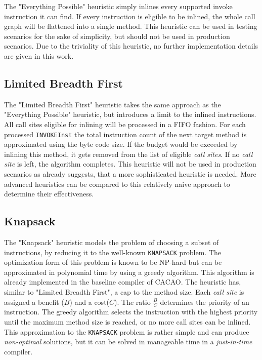 \documentclass[draft, final]{vutinfth} %
\begin{document}
The "Everything Possible" heuristic simply inlines every supported invoke instruction it can find. If every instruction is eligible to be inlined, the whole call graph will be flattened into a single method. This heuristic can be used in testing scenarios for the sake of simplicity, but should not be used in production scenarios. Due to the triviality of this heuristic, no further implementation details are given in this work.

\subsection{Limited Breadth First}

The "Limited Breadth First" heuristic takes the same approach as the "Everything Possible" heuristic, but introduces a limit to the inlined instructions. All call sites eligible for inlining will be processed in a FIFO fashion. For each processed \texttt{INVOKEInst} the total instruction count of the next target method is approximated using the byte code size. If the budget would be exceeded by inlining this method, it gets removed from the list of eligible \emph{call sites}. If no \emph{call site} is left, the algorithm completes. This heuristic will not be used in production scenarios as \cite{Steiner07} already suggests, that a more sophisticated heuristic is needed. More advanced heuristics can be compared to this relatively naive approach to determine their effectiveness.

\subsection{Knapsack}

The "Knapsack" heuristic models the problem of choosing a subset of instructions, by reducing it to the well-known \texttt{KNAPSACK} problem. The optimization form of this problem is known to be NP-hard \cite{Scheifler77} but can be approximated in polynomial time by using a greedy algorithm. This algorithm is already implemented in the baseline compiler of CACAO\cite{Steiner07}. The heuristic has, similar to "Limited Breadth First", a cap to the method size. Each \emph{call site} is assigned a benefit ($B$) and a cost($C$). The ratio $\frac{B}{C}$ determines the priority of an instruction. The greedy algorithm selects the instruction with the highest priority until the maximum method size is reached, or no more call sites can be inlined. This approximation to the \texttt{KNAPSACK} problem is rather simple and can produce \emph{non-optimal} solutions, but it can be solved in manageable time in a \emph{just-in-time} compiler.
\end{document}
